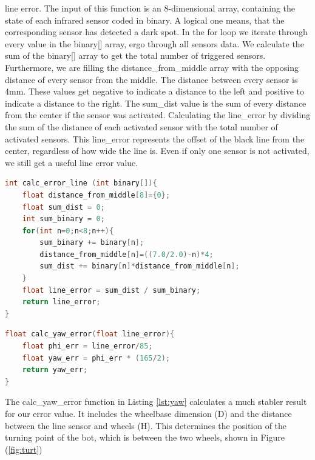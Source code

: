 \documentclass[english]{article}
\begin{document}
line error. The input of this function is an 8-dimensional array, containing
the state of each infrared sensor coded in binary. A logical one means, that
the corresponding sensor has detected a dark spot. In the for loop we iterate
through every value in the binary[] array, ergo through all sensors data. We 
calculate the sum of the binary[] array to get the total number of triggered 
sensors. Furthermore, we are filling the distance\_from\_middle array with the 
 opposing distance of every sensor from the middle. The distance between every
 sensor is 4mm. These values get negative to indicate a distance to the left and 
positive to indicate a distance to the right. The sum\_dist value is the sum of
every distance from the center if the sensor was activated. Calculating the 
line\_error by dividing the sum of the distance of each activated sensor with
 the total number of activated sensors. This line\_error represents the 
 offset of the black line from the center, regardless of how wide the line is.
  Even if only one sensor is not activated, we still get a useful line error value. 
\begin{lstlisting}[language=C, caption={Function to calculate the line error based on a binary array }, label={lst:calcer} ]
int calc_error_line (int binary[]){
    float distance_from_middle[8]={0};
    float sum_dist = 0;
    int sum_binary = 0;
    for(int n=0;n<8;n++){
        sum_binary += binary[n];
        distance_from_middle[n]=((7.0/2.0)-n)*4;
        sum_dist += binary[n]*distance_from_middle[n];
    }
    float line_error = sum_dist / sum_binary;
    return line_error;
}
\end{lstlisting}
\newpage
\begin{lstlisting}[language=C, caption={Conversion from line error to yaw error }, label={lst:yaw} ]
float calc_yaw_error(float line_error){
    float phi_err = line_error/85;
    float yaw_err = phi_err * (165/2);
    return yaw_err;
}
\end{lstlisting}
The calc\_yaw\_error function in Listing \ref{lst:yaw} calculates a much stabler result
 for our error value. It includes the wheelbase dimension (D) and the 
 distance between the line sensor and wheels (H). This determines the 
 position of the turning point of the bot, which is between the two wheels, 
 shown in Figure (\ref{fig:turt}) 
\end{document}
